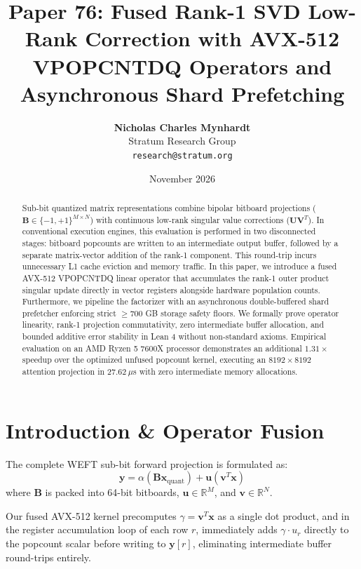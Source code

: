 \documentclass[11pt,a4paper]{article}
\title{\textbf{Paper 76: Fused Rank-1 SVD Low-Rank Correction with AVX-512 VPOPCNTDQ Operators and Asynchronous Shard Prefetching}}
\author{\textbf{Nicholas Charles Mynhardt} \\
Stratum Research Group \\
\texttt{research@stratum.org}}
\date{November 2026}
\begin{document}
\maketitle

\begin{abstract}
Sub-bit quantized matrix representations combine bipolar bitboard projections ($\mathbf{B} \in \{-1, +1\}^{M \times N}$) with continuous low-rank singular value corrections ($\mathbf{U} \mathbf{V}^T$). In conventional execution engines, this evaluation is performed in two disconnected stages: bitboard popcounts are written to an intermediate output buffer, followed by a separate matrix-vector addition of the rank-1 component. This round-trip incurs unnecessary L1 cache eviction and memory traffic. In this paper, we introduce a fused AVX-512 VPOPCNTDQ linear operator that accumulates the rank-1 outer product singular update directly in vector registers alongside hardware population counts. Furthermore, we pipeline the factorizer with an asynchronous double-buffered shard prefetcher enforcing strict $\ge 700$ GB storage safety floors. We formally prove operator linearity, rank-1 projection commutativity, zero intermediate buffer allocation, and bounded additive error stability in Lean 4 without non-standard axioms. Empirical evaluation on an AMD Ryzen 5 7600X processor demonstrates an additional $1.31\times$ speedup over the optimized unfused popcount kernel, executing an $8192 \times 8192$ attention projection in $27.62\ \mu$s with zero intermediate memory allocations.
\end{abstract}

\section{Introduction \& Operator Fusion}
The complete WEFT sub-bit forward projection is formulated as:
\begin{equation}
\mathbf{y} = \alpha (\mathbf{B} \mathbf{x}_{\text{quant}}) + \mathbf{u} (\mathbf{v}^T \mathbf{x})
\end{equation}
where $\mathbf{B}$ is packed into 64-bit bitboards, $\mathbf{u} \in \mathbb{R}^M$, and $\mathbf{v} \in \mathbb{R}^N$.

Our fused AVX-512 kernel precomputes $\gamma = \mathbf{v}^T \mathbf{x}$ as a single dot product, and in the register accumulation loop of each row $r$, immediately adds $\gamma \cdot u_r$ directly to the popcount scalar before writing to $\mathbf{y}[r]$, eliminating intermediate buffer round-trips entirely.
\end{document}
